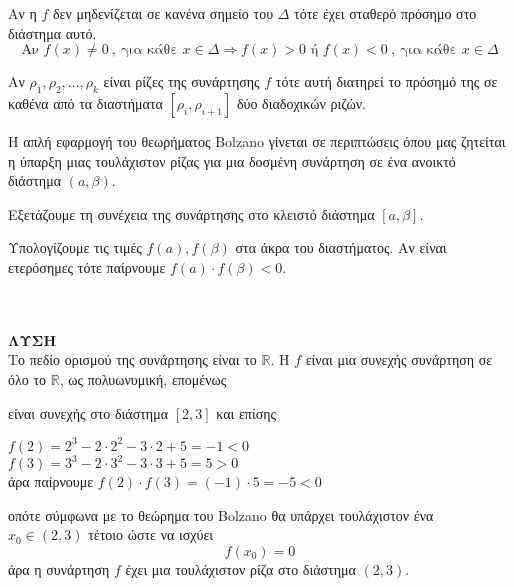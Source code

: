 \documentclass[twoside,nofonts,ektypwsh]{frontisthrio}
\begin{document}
\begin{rlist}
\item Αν η $ f $ δεν μηδενίζεται σε κανένα σημείο του $ \varDelta $ τότε έχει σταθερό πρόσημο στο διάστημα αυτό.
\[ \textrm{Αν }f(x)\neq0\ ,\ \textrm{για κάθε }x\in\varDelta\Rightarrow f(x)>0\textrm{ ή }f(x)<0\ ,\ \textrm{για κάθε }x\in\varDelta \]
\item Αν $ \rho_1,\rho_2,\ldots,\rho_k $ είναι ρίζες της συνάρτησης $ f $ τότε αυτή διατηρεί το πρόσημό της σε καθένα από τα διαστήματα $ [\rho_i,\rho_{i+1}] $ δύο διαδοχικών ριζών.
\end{rlist}
\newpage
\noindent
\methodologia
\begin{Methodos}{5cm}\label{meth_bol}
Η απλή εφαρμογή του θεωρήματος Bolzano γίνεται σε περιπτώσεις όπου μας ζητείται η ύπαρξη μιας τουλάχιστον ρίζας για μια δοσμένη συνάρτηση σε ένα ανοικτό διάστημα $ (a,\beta) $.
\begin{bhma}
\item Εξετάζουμε τη συνέχεια της συνάρτησης στο κλειστό διάστημα $ [a,\beta] $.
\item Υπολογίζουμε τις τιμές $ f(a),f(\beta) $ στα άκρα του διαστήματος. Αν είναι ετερόσημες τότε παίρνουμε $ f(a)\cdot f(\beta)<0 $. 
\end{bhma}
\end{Methodos}
\\\\
\textbf{ΛΥΣΗ}\\
Το πεδίο ορισμού της συνάρτησης είναι το $ \mathbb{R} $. Η $ f $ είναι μια συνεχής συνάρτηση σε όλο το $ \mathbb{R} $, ως πολυωνυμική, επομένως
\begin{rlist}
\item είναι συνεχής στο διάστημα $ [2,3] $ και επίσης
\item $ f(2)=2^3-2\cdot 2^2-3\cdot2+5=-1<0 $ \\
$ f(3)=3^3-2\cdot3^2-3\cdot3+5=5>0  $\\
άρα παίρνουμε $ f(2)\cdot f(3)=(-1)\cdot 5=-5<0 $
\end{rlist}
οπότε σύμφωνα με το θεώρημα του Bolzano θα υπάρχει τουλάχιστον ένα $ x_0\in(2,3) $ τέτοιο ώστε να ισχύει
\[ f(x_0)=0 \]
άρα η συνάρτηση $ f $ έχει μια τουλάχιστον ρίζα στο διάστημα $ (2,3) $.\\\\
\end{document}

